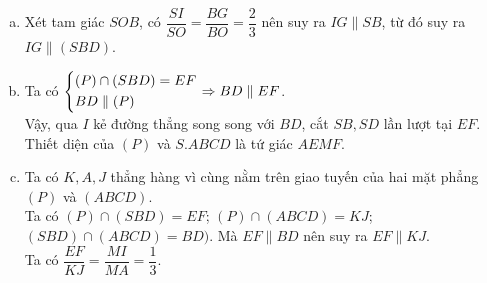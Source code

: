 \begin{bt}
{\begin{enumerate}[a)]
		Tam giác $SAC$ có hai đường trung tuyến $AM$, $SO$ cắt nhau ở $I$ nên $I$ là trọng tâm tam giác $SAC$, suy ra $\dfrac{SI}{SO} = \dfrac{2}{3}$.\\
		Xét tam giác $SBD$ có đường trung tuyến $SO$; $I$ là một điểm thuộc $SO$ và thỏa $\dfrac{SI}{SO} = \dfrac{2}{3}$ nên $I$ là trọng tâm tam giác $SBD$.
		\item Xét tam giác $SOB$, có $\dfrac{SI}{SO} = \dfrac{BG}{BO} = \dfrac{2}{3}$ nên suy ra $IG \parallel SB$, từ đó suy ra $IG \parallel (SBD)$.
		\item Ta có $\left\{\begin{aligned}& (P)\cap (SBD)=EF \\ & BD \parallel (P)\end{aligned}\right. \Rightarrow BD \parallel EF$. \\
		Vậy, qua $I$ kẻ đường thẳng song song với $BD$,  cắt $SB, SD$ lần lượt tại $EF$. Thiết diện của $(P)$ và $S.ABCD$ là tứ giác $AEMF$.
		\item Ta có $K,A,J$ thẳng hàng vì cùng nằm trên giao tuyến của hai mặt phẳng $(P)$ và $(ABCD)$.\\
		Ta có $(P)\cap (SBD)=EF$; $(P)\cap (ABCD)=KJ$; $(SBD)\cap (ABCD)=BD)$. Mà $EF \parallel BD$ nên suy ra $EF \parallel KJ$.\\
		Ta có $\dfrac{EF}{KJ} = \dfrac{MI}{MA} = \dfrac{1}{3}$. 
	\end{enumerate}
}
\end{bt}

